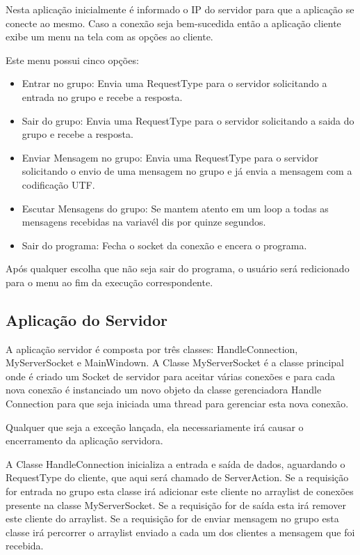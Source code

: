 \documentclass[brazil, a4paper,12pt]{article}
\begin{document}
Nesta aplicação inicialmente é informado o IP do servidor para que a aplicação se conecte ao mesmo. Caso a conexão seja bem-sucedida então a aplicação cliente exibe um menu na tela com as opções ao cliente.

Este menu possui cinco opções:
\begin{itemize}
\item Entrar no grupo: Envia uma RequestType para o servidor solicitando a entrada no grupo e recebe a resposta.
\item Sair do grupo: Envia uma RequestType para o servidor solicitando a saida do grupo e recebe a resposta.
\item Enviar Mensagem no grupo: Envia uma RequestType para o servidor solicitando o envio de uma mensagem no grupo e já envia a mensagem com a codificação UTF.
\item Escutar Mensagens do grupo: Se mantem atento em um loop a todas as mensagens recebidas na variavél dis por quinze segundos.
\item Sair do programa: Fecha o socket da conexão e encera o programa.
\end{itemize}

Após qualquer escolha que não seja sair do programa, o usuário será redicionado para o menu ao fim da execução correspondente.

\subsection{Aplicação do Servidor}

A aplicação servidor é composta por três classes: HandleConnection, MyServerSocket e MainWindown.  A Classe MyServerSocket é a classe principal onde é criado um Socket de servidor para aceitar várias conexões e para cada nova conexão é instanciado um novo objeto da classe gerenciadora Handle Connection para que seja iniciada uma thread para gerenciar esta nova conexão.

Qualquer que seja a exceção lançada, ela necessariamente irá causar o encerramento da aplicação servidora.

A Classe HandleConnection inicializa a entrada e saída de dados, aguardando o RequestType do cliente, que aqui será chamado de ServerAction. Se a requisição for entrada no grupo esta classe irá adicionar este cliente no arraylist de conexões presente na classe MyServerSocket. Se a requisição for de saída esta irá remover este cliente do arraylist. Se a requisição for de enviar mensagem no grupo esta classe irá percorrer o arraylist enviado a cada um dos clientes a mensagem que foi recebida.
\end{document}
